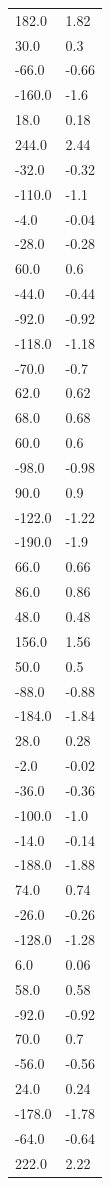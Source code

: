\begin{longtable}{ll}
182.0 & 1.82 \\
30.0 & 0.3 \\
-66.0 & -0.66 \\
-160.0 & -1.6 \\
18.0 & 0.18 \\
244.0 & 2.44 \\
-32.0 & -0.32 \\
-110.0 & -1.1 \\
-4.0 & -0.04 \\
-28.0 & -0.28 \\
60.0 & 0.6 \\
-44.0 & -0.44 \\
-92.0 & -0.92 \\
-118.0 & -1.18 \\
-70.0 & -0.7 \\
62.0 & 0.62 \\
68.0 & 0.68 \\
60.0 & 0.6 \\
-98.0 & -0.98 \\
90.0 & 0.9 \\
-122.0 & -1.22 \\
-190.0 & -1.9 \\
66.0 & 0.66 \\
86.0 & 0.86 \\
48.0 & 0.48 \\
156.0 & 1.56 \\
50.0 & 0.5 \\
-88.0 & -0.88 \\
-184.0 & -1.84 \\
28.0 & 0.28 \\
-2.0 & -0.02 \\
-36.0 & -0.36 \\
-100.0 & -1.0 \\
-14.0 & -0.14 \\
-188.0 & -1.88 \\
74.0 & 0.74 \\
-26.0 & -0.26 \\
-128.0 & -1.28 \\
6.0 & 0.06 \\
58.0 & 0.58 \\
-92.0 & -0.92 \\
70.0 & 0.7 \\
-56.0 & -0.56 \\
24.0 & 0.24 \\
-178.0 & -1.78 \\
-64.0 & -0.64 \\
222.0 & 2.22 \\

\end{longtable}
